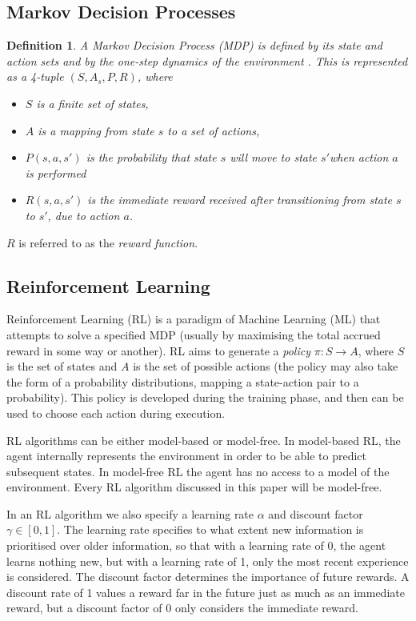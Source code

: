 \newtheorem{definition}{Definition}[subsection]


\subsection{Markov Decision Processes}
\begin{definition}

A Markov Decision Process (MDP) is defined by its state and action sets and by the one-step dynamics of the environment \cite{RLAnIntro}. This is represented as a 4-tuple $(S, A_{s}, P, R)$, where
\begin{itemize}
  \item $S$ is a finite set of states,
  \item $A$ is a mapping from state $s$ to a set of actions,
  \item $P(s, a, s')$ is the probability that state $s$ will move to state $s'$when action $a$ is performed
  \item $R(s, a, s')$ is the immediate reward received after transitioning from state $s$ to $s'$, due to action $a$.
\end{itemize}

\end{definition}
$R$ is referred to as the \textit{reward function}.

\subsection{Reinforcement Learning}
Reinforcement Learning (RL) is a paradigm of Machine Learning (ML) that attempts to solve a specified MDP (usually by maximising the total accrued reward in some way or another). RL aims to generate a \textit{policy} $\pi : S \to A$, where $S$ is the set of states and $A$ is the set of possible actions (the policy may also take the form of a probability distributions, mapping a state-action pair to a probability). This policy is developed during the training phase, and then can be used to choose each action during execution.

RL algorithms can be either model-based or model-free. In model-based RL, the agent internally represents the environment in order to be able to predict subsequent states. In model-free RL the agent has no access to a model of the environment. Every RL algorithm discussed in this paper will be model-free.

In an RL algorithm we also specify a learning rate $\alpha$ and discount factor $\gamma \in [0,1]$. The learning rate specifies to what extent new information is prioritised over older information, so that with a learning rate of 0, the agent learns nothing new, but with a learning rate of 1, only the most recent experience is considered. The discount factor determines the importance of future rewards. A discount rate of 1 values a reward far in the future just as much as an immediate reward, but a discount factor of 0 only considers the immediate reward.




